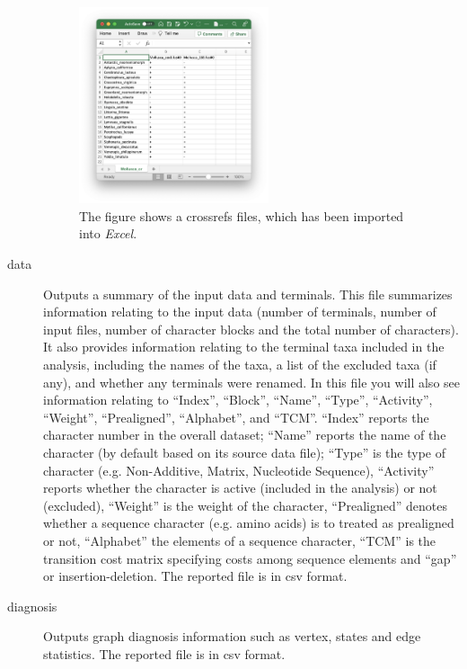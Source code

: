 \begin{description}
		\begin{figure}
		\centering
		\includegraphics[width=0.55\textwidth]{crossrefs1.png}
		\caption{The figure shows a crossrefs files, which has been imported into 
		\textit{Excel}.}
		\label{crossrefs}
		\end{figure}
			
		\item[data] Outputs a summary of the input data and terminals. This file summarizes 
		information relating to the input data (number of terminals, number of input files, 
		number of character blocks and the total number of characters). It also provides
		information relating to the terminal taxa included in the analysis, including the 
		names of the taxa, a list of the excluded taxa (if any), and whether any terminals 
		were renamed. In this file you will also see information relating to ``Index'', ``Block'', 
		``Name'', ``Type'', ``Activity'', ``Weight'', ``Prealigned'', ``Alphabet'', and ``TCM''. 
		``Index'' reports the character number in the overall dataset; ``Name'' reports the 
		name of the character (by default based on its source data file); ``Type'' is the type 
		of character (e.g. Non-Additive, Matrix, Nucleotide Sequence), ``Activity'' reports 
		whether the character is active (included in the analysis) or not (excluded), 
		``Weight'' is the weight of the character, ``Prealigned''  denotes whether a 
		sequence character (e.g. amino acids) is to treated as prealigned or not, 
		``Alphabet'' the elements of a sequence character, ``TCM'' is the transition cost 
		matrix specifying costs among sequence elements and ``gap'' or insertion-deletion.
		The reported file is in csv format.
	
		\item[diagnosis] Outputs graph diagnosis information such as vertex, states 
		and edge statistics. The reported file is in csv format. 
		

\end{description}
